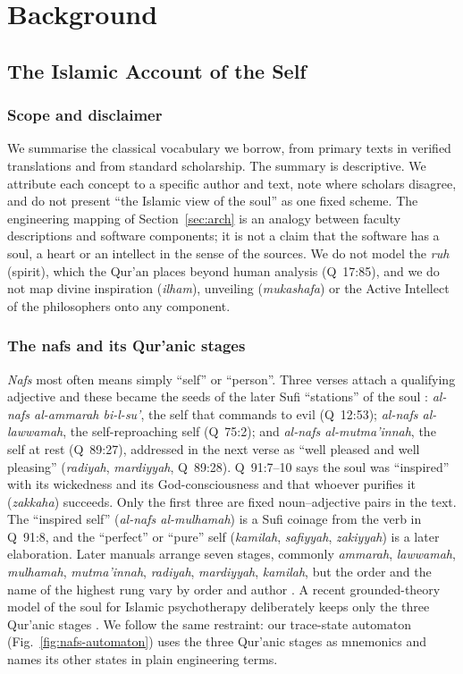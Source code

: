 \section{Background}
\label{sec:background}

\subsection{The Islamic Account of the Self}
\label{sec:islamic}

\subsubsection{Scope and disclaimer}
We summarise the classical vocabulary we borrow, from primary texts in
verified translations and from standard scholarship. The summary is
descriptive. We attribute each concept to a specific author and text, note
where scholars disagree, and do not present ``the Islamic view of the soul'' as
one fixed scheme. The engineering mapping of Section~\ref{sec:arch} is an
analogy between faculty descriptions and software components; it is not a
claim that the software has a soul, a heart or an intellect in the sense of the
sources. We do not model the \emph{ruh} (spirit), which the Qur'an places
beyond human analysis (Q~17:85), and we do not map divine inspiration
(\emph{ilham}), unveiling (\emph{mukashafa}) or the Active Intellect of the
philosophers onto any component.

\subsubsection{The nafs and its Qur'anic stages}
\emph{Nafs} most often means simply ``self'' or ``person''. Three verses attach
a qualifying adjective and these became the seeds of the later Sufi
``stations'' of the soul \cite{AbdelHaleem2008Quran,CalverleyNetton2012Nafs}:
\emph{al-nafs al-ammarah bi-l-su\textquoteright}, the self that commands to
evil (Q~12:53); \emph{al-nafs al-lawwamah}, the self-reproaching self
(Q~75:2); and \emph{al-nafs al-mutma\textquoteright innah}, the self at rest
(Q~89:27), addressed in the next verse as ``well pleased and well pleasing''
(\emph{radiyah}, \emph{mardiyyah}, Q~89:28). Q~91:7--10 says the soul was
``inspired'' with its wickedness and its God-consciousness and that whoever
purifies it (\emph{zakkaha}) succeeds. Only the first three are fixed
noun--adjective pairs in the text. The ``inspired self''
(\emph{al-nafs al-mulhamah}) is a Sufi coinage from the verb in Q~91:8, and the
``perfect'' or ``pure'' self (\emph{kamilah}, \emph{safiyyah}, \emph{zakiyyah})
is a later elaboration. Later manuals arrange seven stages, commonly
\emph{ammarah}, \emph{lawwamah}, \emph{mulhamah}, \emph{mutma\textquoteright innah},
\emph{radiyah}, \emph{mardiyyah}, \emph{kamilah}, but the order and the name of
the highest rung vary by order and author \cite{Schimmel1975}. A recent
grounded-theory model of the soul for Islamic psychotherapy deliberately keeps
only the three Qur'anic stages \cite{RothmanCoyle2018}. We follow the same
restraint: our trace-state automaton (Fig.~\ref{fig:nafs-automaton}) uses the
three Qur'anic stages as mnemonics and names its other states in plain
engineering terms.

